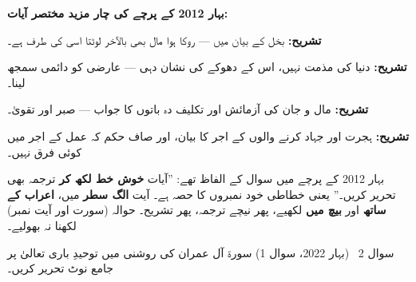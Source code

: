 \begin{hal}
\medskip
\textbf{بہار \textenglish{2012} کے پرچے کی چار مزید مختصر آیات:}

\textbf{تشریح:} بخل کے بیان میں --- روکا ہوا مال بھی بالآخر لوٹتا اسی کی طرف ہے۔

\textbf{تشریح:} دنیا کی مذمت نہیں، اس کے دھوکے کی نشان دہی --- عارضی کو دائمی
سمجھ لینا۔

\textbf{تشریح:} مال و جان کی آزمائش اور تکلیف دہ باتوں کا جواب --- صبر اور
تقویٰ۔

\textbf{تشریح:} ہجرت اور جہاد کرنے والوں کے اجر کا بیان، اور صاف حکم کہ عمل کے
اجر میں  کوئی فرق نہیں۔
\end{hal}

\begin{nukta}
بہار \textenglish{2012} کے پرچے میں سوال کے الفاظ تھے: ''آیات \textbf{خوش خط
لکھ کر} ترجمہ بھی تحریر کریں۔'' یعنی خطاطی خود نمبروں کا حصہ ہے۔ آیت
\textbf{الگ سطر} میں، \textbf{اعراب کے ساتھ} اور \textbf{بیچ میں} لکھیے، پھر
نیچے ترجمہ، پھر تشریح۔ حوالہ (سورت اور آیت نمبر) لکھنا نہ بھولیے۔
\end{nukta}

\begin{sawal}{سوال \textenglish{2} \ \textnormal{\small(بہار \textenglish{2022}، سوال \textenglish{1})}}
سورۃ آل عمران کی روشنی میں توحیدِ باری تعالیٰ پر جامع نوٹ تحریر کریں۔
\end{sawal}

